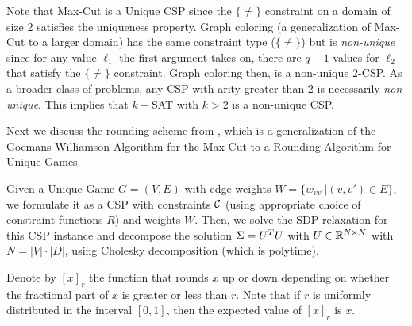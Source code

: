 Note that Max-Cut is a Unique CSP since the $\{\neq\}$ constraint on a domain of size 2 satisfies the uniqueness property. Graph coloring (a generalization of Max-Cut to a larger domain) has the same constraint type ($\{\neq\}$) but is \textit{non-unique} since for any value $\ell_1$ the first argument takes on, there are $q-1$ values for $\ell_2$ that satisfy the $\{\neq\}$ constraint. Graph coloring then, is a non-unique 2-CSP. As a broader class of problems, any CSP with arity greater than 2 is necessarily \textit{non-unique}. This implies that $k-$SAT with $k > 2$ is a non-unique CSP.

Next we discuss the rounding scheme from \cite{cmm06}, which is a generalization of the Goemans Williamson Algorithm for the Max-Cut to a Rounding Algorithm for Unique Games. 

Given a Unique Game $G = (V,E)$ with edge weights $W = \{w_{vv'} | (v, v') \in E \}$, we formulate it as a CSP with constraints $\mathcal{C}$ (using appropriate choice of constraint functions $R$) and weights $W$. Then, we solve the SDP relaxation for this CSP instance and decompose the solution $\Sigma = U^T U$ with $U \in \mathbb{R}^{N \times N}$ with $N = |V| \cdot |D|$, using Cholesky decomposition (which is polytime). 

Denote by $[x]_r$ the function that rounds $x$ up or down depending on whether the fractional part of $x$ is greater or less than $r$. 
Note that if $r$ is uniformly distributed in the interval $[0,1]$, then the expected value of $[x]_r$ is $x$. 

